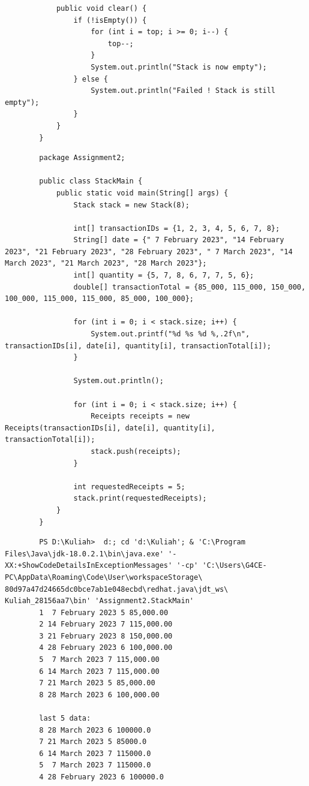 \documentclass[12pt,titlepage]{article}
\begin{document}
\begin{enumerate}
\begin{verbatim}
            public void clear() {
                if (!isEmpty()) {
                    for (int i = top; i >= 0; i--) {
                        top--;
                    }
                    System.out.println("Stack is now empty");
                } else {
                    System.out.println("Failed ! Stack is still empty");
                }
            }
        }
    \end{verbatim}
    \begin{verbatim}
        package Assignment2;

        public class StackMain {
            public static void main(String[] args) {
                Stack stack = new Stack(8);

                int[] transactionIDs = {1, 2, 3, 4, 5, 6, 7, 8};
                String[] date = {" 7 February 2023", "14 February 2023", "21 February 2023", "28 February 2023", " 7 March 2023", "14 March 2023", "21 March 2023", "28 March 2023"};
                int[] quantity = {5, 7, 8, 6, 7, 7, 5, 6};
                double[] transactionTotal = {85_000, 115_000, 150_000, 100_000, 115_000, 115_000, 85_000, 100_000};

                for (int i = 0; i < stack.size; i++) {
                    System.out.printf("%d %s %d %,.2f\n", transactionIDs[i], date[i], quantity[i], transactionTotal[i]);
                }

                System.out.println();

                for (int i = 0; i < stack.size; i++) {
                    Receipts receipts = new Receipts(transactionIDs[i], date[i], quantity[i], transactionTotal[i]);
                    stack.push(receipts);
                }

                int requestedReceipts = 5;
                stack.print(requestedReceipts);
            }
        }
    \end{verbatim}
    \begin{verbatim}
        PS D:\Kuliah>  d:; cd 'd:\Kuliah'; & 'C:\Program Files\Java\jdk-18.0.2.1\bin\java.exe' '-XX:+ShowCodeDetailsInExceptionMessages' '-cp' 'C:\Users\G4CE-PC\AppData\Roaming\Code\User\workspaceStorage\ 80d97a47d24665dc0bce7ab1e048ecbd\redhat.java\jdt_ws\ Kuliah_28156aa7\bin' 'Assignment2.StackMain' 
        1  7 February 2023 5 85,000.00
        2 14 February 2023 7 115,000.00
        3 21 February 2023 8 150,000.00
        4 28 February 2023 6 100,000.00
        5  7 March 2023 7 115,000.00
        6 14 March 2023 7 115,000.00
        7 21 March 2023 5 85,000.00
        8 28 March 2023 6 100,000.00

        last 5 data:
        8 28 March 2023 6 100000.0
        7 21 March 2023 5 85000.0
        6 14 March 2023 7 115000.0
        5  7 March 2023 7 115000.0
        4 28 February 2023 6 100000.0
    \end{verbatim}
\end{enumerate}
\end{document}
